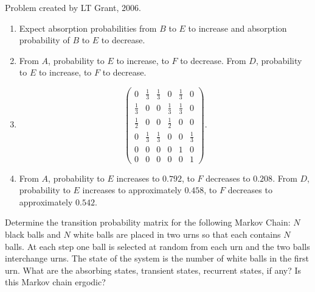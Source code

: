 \documentclass[12pt]{article}
\begin{document}
\begin{solution}
    Problem created by LT Grant, 2006.
    \begin{enumerate}[label=(\alph*)]
    \item
        Expect absorption probabilities from \( B \) to \(E\) to
        increase and absorption probability of \( B \) to \( E \) to decrease.
    \item
        From \( A \), probability to \( E \) to increase, to \( F \) to
        decrease. From \( D \), probability to \( E \) to increase, to \(
        F \) to decrease.
    \item
        \[
            \begin{pmatrix}
                0 & \frac{1}{3} & \frac{1}{3} & 0 & \frac{1}{3} & 0\\
                \frac{1}{3} & 0 & 0 & \frac{1}{3} & \frac{1}{3} & 0\\
                \frac{1}{2} & 0 & 0 & \frac{1}{2} & 0 & 0\\
                0 & \frac{1}{3} & \frac{1}{3} & 0 & 0 & \frac{1}{3}\\
                0 & 0 & 0 & 0 & 1 & 0\\
                0 & 0 & 0 & 0 & 0 & 1
            \end{pmatrix}
            .
        \]
    \item
        From \( A \), probability to \( E \) increases to \( 0.792 \), to \( F \)
        decreases to \( 0.208 \). From \( D \), probability to \( E \)
        increases to approximately \( 0.458 \), to \( F \) decreases to approximately \(
        0.542 \).
\end{enumerate}
\end{solution}
\begin{exercise}
    Determine the transition probability matrix for the following Markov
    Chain:  \( N \) black balls and \( N \) white balls are placed in
    two urns so that each contains \( N \) balls.  At each step one ball
    is selected at random from each urn and the two balls interchange
    urns.  The state of the system is the number of white balls in the
    first urn.  What are the absorbing states, transient states,
    recurrent states, if any?  Is this Markov chain ergodic?
\end{exercise}
\end{document}
